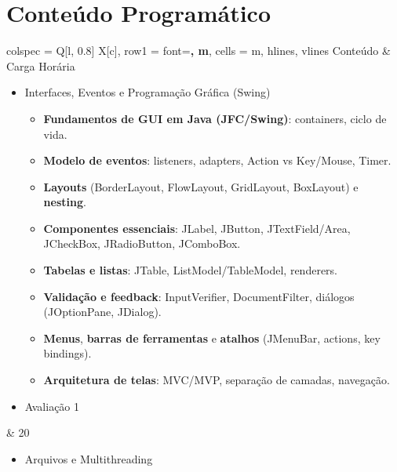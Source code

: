 \documentclass[a4paper, 12pt]{article}
\begin{document}
\newpage
\section{Conteúdo Programático}

\begin{longtblr}{colspec = {Q[l, 0.8\textwidth] X[c]},
        row{1} = {font=\bfseries, m},
        cells = {m},
        hlines, vlines
        }
    Conteúdo & Carga Horária\\
    \begin{itemize}
        \item Interfaces, Eventos e Programação Gráfica (Swing)
            \begin{itemize}
                \item \textbf{Fundamentos de GUI em Java (JFC/Swing)}: containers, ciclo de vida.
                \item \textbf{Modelo de eventos}: listeners, adapters, Action vs Key/Mouse, Timer.
                \item \textbf{Layouts} (BorderLayout, FlowLayout, GridLayout, BoxLayout) e \textbf{nesting}.
                \item \textbf{Componentes essenciais}: JLabel, JButton, JTextField/Area, JCheckBox, JRadioButton, JComboBox.
                \item \textbf{Tabelas e listas}: JTable, ListModel/TableModel, renderers.
                \item \textbf{Validação e feedback}: InputVerifier, DocumentFilter, diálogos (JOptionPane, JDialog).
                \item \textbf{Menus}, \textbf{barras de ferramentas} e \textbf{atalhos} (JMenuBar, actions, key bindings).
                \item \textbf{Arquitetura de telas}: MVC/MVP, separação de camadas, navegação.
            \end{itemize}
        \item Avaliação 1
    \end{itemize} & 20\\
    \begin{itemize}
        \item Arquivos e Multithreading
            \begin{itemize}

\end{itemize}
\end{itemize}
\end{longtblr}
\end{document}
